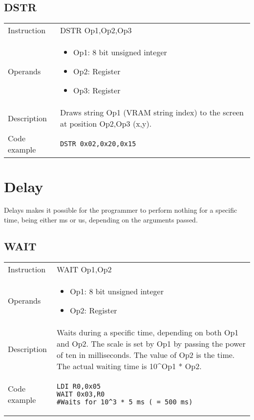 \subsection{DSTR}
\renewcommand*{\arraystretch}{2.0}
\begin{longtable}{P{3cm}P{9cm}}
\midrule
\noindent Instruction & DSTR Op1,Op2,Op3 \\
\noindent Operands &
\begin{itemize}[label={},noitemsep,leftmargin=*,topsep=0pt,partopsep=0pt, itemsep=1em]
\item Op1: 8 bit unsigned integer

\item Op2: Register

\item Op3: Register
\end{itemize}\\
\noindent Description & Draws string Op1 (VRAM string index) to the screen at position Op2,Op3 (x,y). \\
\noindent Code example & 
\begin{lstlisting}
DSTR 0x02,0x20,0x15
\end{lstlisting} \\
\end{longtable}


\newpage

\section{Delay}
Delays makes it possible for the programmer to perform nothing for a specific time, being either ms or us, depending on the arguments passed.

\subsection{WAIT}
\renewcommand*{\arraystretch}{2.0}
\begin{longtable}{P{3cm}P{9cm}}
\midrule
\noindent Instruction & WAIT Op1,Op2 \\
\noindent Operands &
\begin{itemize}[label={},noitemsep,leftmargin=*,topsep=0pt,partopsep=0pt, itemsep=1em]
\item Op1: 8 bit unsigned integer

\item Op2: Register
\end{itemize}\\
\noindent Description & Waits during a specific time, depending on both Op1 and Op2. The scale is set by Op1 by passing the power of ten in milliseconds. The value of Op2 is the time. The actual waiting time is 10^Op1 * Op2. \\
\noindent Code example & 
\begin{lstlisting}
LDI R0,0x05
WAIT 0x03,R0
#Waits for 10^3 * 5 ms ( = 500 ms)
\end{lstlisting} \\
\end{longtable}


